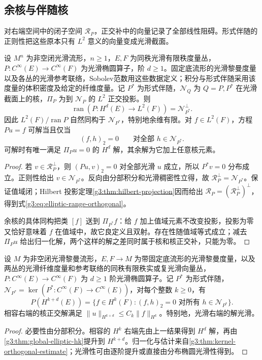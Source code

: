 \subsection{余核与伴随核}
\label{g3:subsec:1302:03}
对右端空间中的闭子空间 \(\mathcal R_P\)，正交补中的向量记录了全部线性阻碍。形式伴随的正则性把这些原本只有 \(L^2\) 意义的向量变成光滑截面。

\begin{theorem}[椭圆 Fredholm 选择]\label{g3:thm:elliptic-fredholm}
	设 \(M^n\) 为非空闭光滑流形，\(n\ge1\)，\(E,F\) 为同秩光滑有限秩度量丛，\(P:C^\infty(E)\to C^\infty(F)\) 为光滑椭圆算子，阶 \(d\ge1\)。固定底流形的光滑黎曼度量以及各丛的光滑参考联络，Sobolev范数用这些数据定义；积分与形式伴随采用该度量的体积密度及给定的纤维度量。记 \(P^*\) 为形式伴随，\(\mathcal N_Q\) 为 \(Q=P,P^*\) 在光滑截面上的核，\(\Pi_P\) 为到 \(\mathcal N_P\) 的 \(L^2\) 正交投影。则
	\begin{equation}\label{g3:eq:elliptic-range-orthogonal}
		\operatorname{ran}(P:H^d(E)\to L^2(F))
		=\mathcal N_{P^*}^{\perp}.
	\end{equation}
	因此 \(L^2(F)/\operatorname{ran}P\) 自然同构于 \(\mathcal N_{P^*}\)，特别地余维有限。对 \(f\in L^2(F)\)，方程 \(Pu=f\) 可解当且仅当
	\[
		(f,h)_2=0\qquad\text{对全部 }h\in\mathcal N_{P^*}.
	\]
	可解时有唯一满足 \(\Pi_Pu=0\) 的 \(H^d\) 解，其余解为它加上任意核元素。
\end{theorem}
\begin{proof}
	若 \(v\in\mathcal R_P^\perp\)，则 \((Pu,v)_2=0\) 对全部光滑 \(u\) 成立，所以 \(P^*v=0\) 分布成立。正则性给出 \(v\in\mathcal N_{P^*}\)。反向由分部积分和光滑稠密性立得，故
	\(\mathcal R_P^\perp=\mathcal N_{P^*}\)。保证值域闭；Hilbert 投影定理\cref{g3:thm:hilbert-projection}因而给出
	\(\mathcal R_P=(\mathcal R_P^\perp)^\perp\)，得到式\eqref{g3:eq:elliptic-range-orthogonal}。

	余核的具体同构把类 \([f]\) 送到 \(\Pi_{P^*}f\)：给 \(f\) 加上值域元素不改变投影，投影为零又恰好意味着 \(f\) 在值域中，故它良定义且双射。存在性随值域等式成立；减去 \(\Pi_Pu\) 给出归一化解，两个这样的解之差同时属于核和核正交补，只能为零。
\end{proof}

\begin{corollary}\label{g3:cor:elliptic-range-hk}
	设 \(M\) 为非空闭光滑黎曼流形，\(E,F\to M\) 为带固定底流形的光滑黎曼度量，以及两丛的光滑纤维度量和参考联络的同秩有限秩实或复光滑向量丛，\(P:C^\infty(E)\to C^\infty(F)\) 为 \(d\ge1\) 阶光滑椭圆算子。记 \(P^*\) 为形式伴随，\(\mathcal N_{P^*}=\ker(P^*:C^\infty(F)\to C^\infty(E))\)，对每个整数 \(k\ge0\)，有
	\[
		P(H^{k+d}(E))=\{f\in H^k(F):(f,h)_2=0\text{ 对所有 }h\in\mathcal N_{P^*}\}.
	\]
	相容右端的核正交解满足 \(\|u\|_{H^{k+d}}\le C_k\|f\|_{H^k}\)。特别地，光滑右端的解光滑。
\end{corollary}
\begin{proof}
	必要性由分部积分。相容的 \(H^k\) 右端先由上一结果得到 \(H^d\) 解，再由\cref{g3:thm:global-elliptic-hk}提升到 \(H^{k+d}\)。归一化与估计来自\cref{g3:thm:kernel-orthogonal-estimate}；光滑性可由逐阶提升或直接由分布椭圆光滑性得到。
\end{proof}

